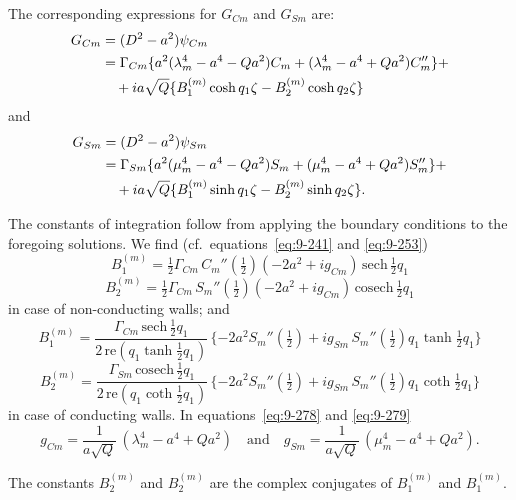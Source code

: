 The corresponding expressions for $G_{Cm}$ and $G_{Sm}$ are:
\begin{align}
G_{Cm} &= (D^2 - a^2)\psi_{Cm} \notag \\
&= \Gamma_{Cm}\{a^2(\lambda_m^4 - a^4 - Qa^2)C_m + (\lambda_m^4 - a^4 + Qa^2)C_m''\} + \notag \\
&\quad + ia\sqrt{Q}\{B_1^{(m)}\cosh q_1\zeta - B_2^{(m)}\cosh q_2\zeta\} \label{eq:9-276}
\end{align}
and
\begin{align}
G_{Sm} &= (D^2 - a^2)\psi_{Sm} \notag \\
&= \Gamma_{Sm}\{a^2(\mu_m^4 - a^4 - Qa^2)S_m + (\mu_m^4 - a^4 + Qa^2)S_m''\} + \notag \\
&\quad + ia\sqrt{Q}\{B_1^{(m)}\sinh q_1\zeta - B_2^{(m)}\sinh q_2\zeta\}. \label{eq:9-277}
\end{align}

The constants of integration follow from applying the boundary conditions to the foregoing solutions. We find (cf.\ equations~\eqref{eq:9-241} and \eqref{eq:9-253})
\begin{equation}
B_1^{(m)} = \tfrac{1}{2}\Gamma_{Cm}\, C_m''(\tfrac{1}{2})(-2a^2 + ig_{Cm})\,\mathrm{sech}\,\tfrac{1}{2}q_1 \label{eq:9-278}
\end{equation}
\[
B_2^{(m)} = \tfrac{1}{2}\Gamma_{Cm}\, S_m''(\tfrac{1}{2})(-2a^2 + ig_{Cm})\,\mathrm{cosech}\,\tfrac{1}{2}q_1
\]
in case of non-conducting walls; and
\begin{equation}
B_1^{(m)} = \frac{\Gamma_{Cm}\,\mathrm{sech}\,\tfrac{1}{2}q_1}{2\,\mathrm{re}(q_1\tanh\tfrac{1}{2}q_1)}\,\{-2a^2 S_m''(\tfrac{1}{2}) + ig_{Sm}\, S_m''(\tfrac{1}{2})q_1\tanh\tfrac{1}{2}q_1\} \label{eq:9-279}
\end{equation}
\[
B_2^{(m)} = \frac{\Gamma_{Sm}\,\mathrm{cosech}\,\tfrac{1}{2}q_1}{2\,\mathrm{re}(q_1\coth\tfrac{1}{2}q_1)}\,\{-2a^2 S_m''(\tfrac{1}{2}) + ig_{Sm}\, S_m''(\tfrac{1}{2})q_1\coth\tfrac{1}{2}q_1\}
\]
in case of conducting walls. In equations~\eqref{eq:9-278} and \eqref{eq:9-279}
\begin{equation}
g_{Cm} = \frac{1}{a\sqrt{Q}}\,(\lambda_m^4 - a^4 + Qa^2) \quad \text{and} \quad g_{Sm} = \frac{1}{a\sqrt{Q}}\,(\mu_m^4 - a^4 + Qa^2). \label{eq:9-280}
\end{equation}

The constants $B_2^{(m)}$ and $B_2^{(m)}$ are the complex conjugates of $B_1^{(m)}$ and $B_1^{(m)}$.

